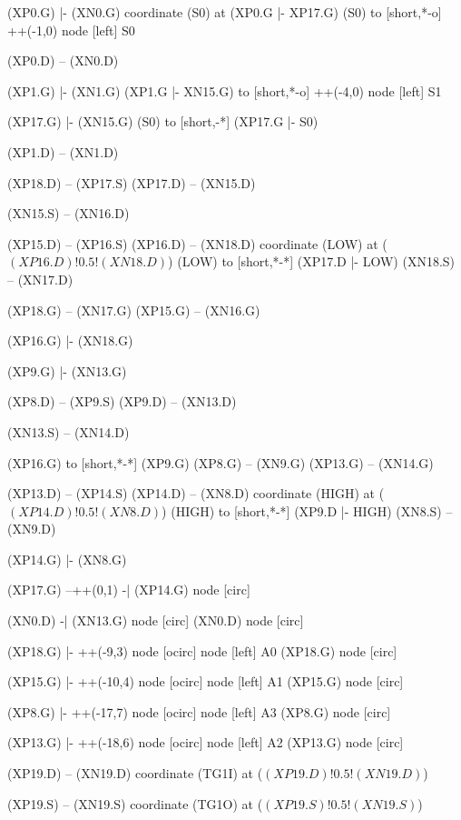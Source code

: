 \begin{circuitikz}[american]

	(XP0.G) |- (XN0.G)
	coordinate (S0) at (XP0.G |- XP17.G)
	(S0) to [short,*-o] ++(-1,0) node [left] {S0}	
	
	(XP0.D) -- (XN0.D)
	
	(XP1.G) |- (XN1.G)
	(XP1.G |- XN15.G) to [short,*-o] ++(-4,0) node [left] {S1}	
	
	(XP17.G) |- (XN15.G)
	(S0) to [short,-*] (XP17.G |- S0)
	
	(XP1.D) -- (XN1.D)

	(XP18.D) -- (XP17.S)
	(XP17.D) -- (XN15.D)
	
	(XN15.S) -- (XN16.D)
	
	(XP15.D) -- (XP16.S)
	(XP16.D) -- (XN18.D)
	coordinate (LOW) at ($(XP16.D)!0.5!(XN18.D)$)
	(LOW) to [short,*-*] (XP17.D |- LOW)
	(XN18.S) -- (XN17.D)
	
	(XP18.G) -- (XN17.G)
	(XP15.G) -- (XN16.G)

	(XP16.G) |- (XN18.G)
	
	(XP9.G) |- (XN13.G)
	
	
	(XP8.D) -- (XP9.S)
	(XP9.D) -- (XN13.D)
	
	(XN13.S) -- (XN14.D)
	
	
	(XP16.G) to [short,*-*] (XP9.G)
	(XP8.G) -- (XN9.G)
	(XP13.G) -- (XN14.G)
	
	(XP13.D) -- (XP14.S)
	(XP14.D) -- (XN8.D)
	coordinate (HIGH) at ($(XP14.D)!0.5!(XN8.D)$)
	(HIGH) to [short,*-*] (XP9.D |- HIGH)
	(XN8.S) -- (XN9.D)
	
	(XP14.G) |- (XN8.G)

	(XP17.G) --++(0,1) -| (XP14.G) node [circ] {}
	
	(XN0.D) -| (XN13.G) node [circ] {}
	(XN0.D) node [circ] {}	
	
	(XP18.G) |- ++(-9,3) node [ocirc] {} node [left] {A0}
	(XP18.G) node [circ] {}
	
	(XP15.G) |- ++(-10,4) node [ocirc] {} node [left] {A1}
	(XP15.G) node [circ] {}
	
	(XP8.G) |- ++(-17,7) node [ocirc] {} node [left] {A3}
	(XP8.G) node [circ] {}
	
	(XP13.G) |- ++(-18,6) node [ocirc] {} node [left] {A2}
	(XP13.G) node [circ] {}
	
	
	
	(XP19.D) -- (XN19.D)
	coordinate (TG1I) at ($(XP19.D)!0.5!(XN19.D)$)
	
	(XP19.S) -- (XN19.S)
	coordinate (TG1O) at ($(XP19.S)!0.5!(XN19.S)$)
	

\end{circuitikz}
